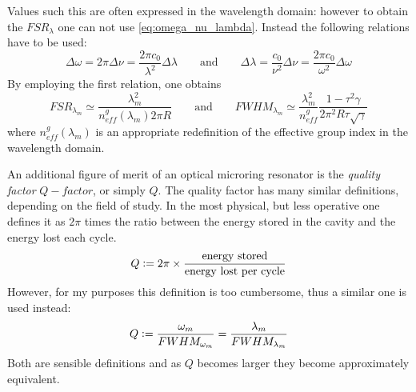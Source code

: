 Values such this are often expressed in the wavelength domain: however to obtain the $FSR_\lambda$ one can not use \cref{eq:omega_nu_lambda}.
Instead the following relations have to be used:
\begin{equation}
	\Delta\omega = 2\pi \Delta \nu = \dfrac{2\pi c_0}{\lambda^2}\Delta\lambda
		\qquad \mathrm{and} \qquad
	\Delta\lambda = \dfrac{c_0}{\nu^2}\Delta\nu = \dfrac{2\pi c_0}{\omega^2}\Delta\omega
\end{equation}
By employing the first relation, one obtains
\begin{equation}
	FSR_{\lambda_m} \simeq \dfrac{\lambda_m^2}{n_{eff}^g\left(\lambda_m\right) 2\pi R}
		\qquad \mathrm{and} \qquad
	FWHM_{\lambda_m} \simeq	\dfrac{\lambda_m^2}{n_{eff}^g}
													\dfrac{1- \tau^2\gamma}{2\pi^2 R \tau \sqrt{\gamma}}
\end{equation}
where $n_{eff}^g\left(\lambda_m\right)$ is an appropriate redefinition of the effective group index in the wavelength domain.

An additional figure of merit of an optical microring resonator is the \textit{quality factor} $Q-factor$, or simply $Q$.
The quality factor has many similar definitions, depending on the field of study.
In the most physical, but less operative one defines it as $2\pi$ times the ratio between the energy stored in the cavity and the energy lost each cycle.
$$Q \vcentcolon= 2\pi \times \frac{\mathrm{energy~stored}}{\mathrm{energy~lost~per~cycle}}$$
However, for my purposes this definition is too cumbersome, thus a similar one is used instead:
\begin{equation}
Q \vcentcolon= \dfrac{\omega_m}{FWHM_{\omega_m}} = \dfrac{\lambda_m}{FWHM_{\lambda_m}}
\end{equation}
Both are sensible definitions and as $Q$ becomes larger they become approximately equivalent.

\begin{figure}
	\centering
	\begin{subfigure}[t]{0.47\textwidth}
		\centering
		
	\end{subfigure}
	\hspace{0.03\textwidth}
	\begin{subfigure}[t]{0.47\textwidth}
		\centering
		
	\end{subfigure}
\end{figure}

